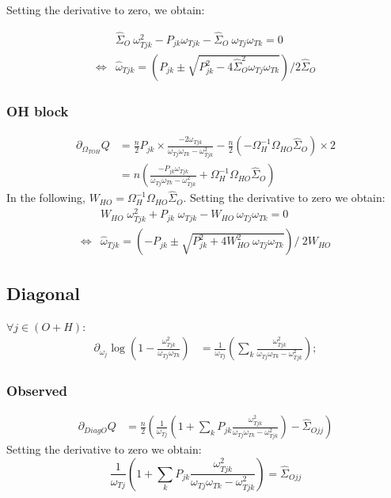 \documentclass[11pt,a4paper]{article}
\begin{document}
Setting the derivative to zero, we obtain:

\begin{align*}
& \widehat{\Sigma}_O \:\omega_{Tjk}^2 - P_{jk} \omega_{Tjk} -  \widehat{\Sigma}_O \: \omega_{Tj}\omega_{Tk} =0\\
\iff & \hat{\omega}_{Tjk} = \left(P_{jk} \pm \sqrt{P_{jk}^2 - 4\widehat{\Sigma}_O^2 \omega_{Tj}\omega_{Tk}}\right) /2 \widehat{\Sigma}_O
\end{align*}

\subsubsection{OH block}
\begin{align*}
\partial_{\Omega_{TOH}}Q &= \frac{n}{2}P_{jk}\times \frac{-2\omega_{Tjk}}{\omega_{Tj}\omega_{Tk}-\omega_{Tjk}^2} - \frac{n}{2} (-\Omega_H^{-1} \Omega_{HO} \widehat{\Sigma}_O) \times 2\\
&=n\left(\frac{-P_{jk} \omega_{Tjk}}{\omega_{Tj}\omega_{Tk}-\omega_{Tjk}^2} + \Omega_H^{-1} \Omega_{HO} \widehat{\Sigma}_O \right)
\end{align*}
In the following, $W_{HO} =\Omega_H^{-1} \Omega_{HO} \widehat{\Sigma}_O $. Setting the derivative to zero we obtain:
\begin{align*}
&W_{HO} \; \omega_{Tjk}^2 + P_{jk} \; \omega_{Tjk} - W_{HO} \:\omega_{Tj}\omega_{Tk} = 0\\
\iff& \hat{\omega}_{Tjk} = \left( -P_{jk} \pm \sqrt{P_{jk}^2 + 4W_{HO}^2\:\omega_{Tj}\omega_{Tk}}\right) / \: 2W_{HO}
\end{align*}

\subsection{Diagonal}
$\forall j \in (O+H)$:
\begin{align*}
\partial_{\omega_{j}}\log\left(1-\frac{\omega_{Tjk}^2}{\omega_{Tj}\omega_{Tk}}\right) &= \frac{1}{\omega_{Tj}}\left( \sum_{k} \frac{\omega_{Tjk} ^2}{\omega_{Tj}\omega_{Tk} - \omega_{Tjk} ^2}  \right);
\end{align*}
\subsubsection{Observed}
\begin{align*}
\partial_{DiagO}Q &= \frac{n}{2}\left( \frac{1}{\omega_{Tj}}\left( 1 + \sum_{k} P_{jk} \frac{\omega_{Tjk} ^2}{\omega_{Tj}\omega_{Tk} - \omega_{Tjk} ^2}  \right) - \widehat{\Sigma}_{Ojj}\right)
\end{align*}
Setting the derivative to zero we obtain:
$$ \frac{1}{\omega_{Tj}}\left( 1 + \sum_{k} P_{jk} \frac{\omega_{Tjk} ^2}{\omega_{Tj}\omega_{Tk} - \omega_{Tjk} ^2}  \right) =\widehat{\Sigma}_{Ojj}$$
\end{document}
